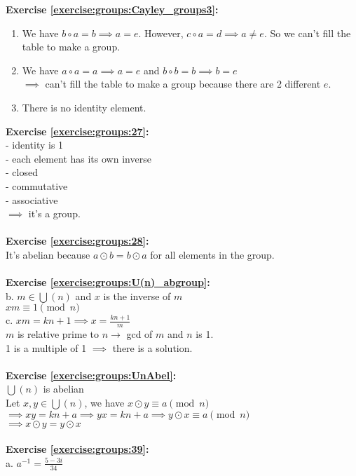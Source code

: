 \textbf{Exercise \ref{exercise:groups:Cayley_groups3}:}
\begin{enumerate}
\item
We have $b\circ a=b\implies a=e$. However, $c\circ a=d\implies a\neq e$.
So we can't fill the table to make a group.
\item
 We have $a\circ a=a\implies a=e$ and $b\circ b=b\implies b=e$\\
$\implies$  can't fill the table to make a group because there are 2 different $e$.
\item
There is no identity element.
\end{enumerate}
\textbf{Exercise \ref{exercise:groups:27}:}\\
- identity is 1\\
- each element has its own inverse\\
- closed\\
- commutative\\
- associative\\
$\implies$  it's a group.\\
\\
\textbf{Exercise \ref{exercise:groups:28}:}\\
It's abelian because $a\odot b=b\odot a$ for all elements in the group.\\
\\
\textbf{Exercise \ref{exercise:groups:U(n)_abgroup}:}\\
b. $m\in\bigcup(n)$ and $x$ is the inverse of $m$\\
$xm\equiv 1 \pmod{n}$\\
c. $xm=kn+1\implies x=\displaystyle\frac{kn+1}{m}$\\
$m$ is relative prime to $n\to$ gcd of $m$ and $n$ is 1.\\
1 is a multiple of 1 $\implies$  there is a solution.\\
\\
\textbf{Exercise \ref{exercise:groups:UnAbel}:}\\
$\bigcup(n)$ is abelian\\
Let $x,y\in\bigcup(n)$, we have $x\odot y\equiv a\pmod{n}$\\
$\implies xy=kn+a\implies yx=kn+a\implies y\odot x\equiv a\pmod{n}$\\
$\implies x\odot y=y\odot x$\\
\\
\textbf{Exercise \ref{exercise:groups:39}:}\\
a. $a^{-1}=\displaystyle\frac{5-3i}{34}$\\
